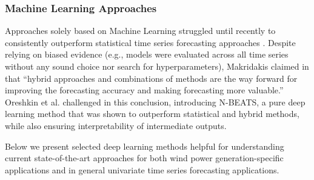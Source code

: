 \subsubsection{Machine Learning Approaches}\label{subsubsec:ml_methods}

Approaches solely based on Machine Learning struggled until recently to consistently outperform statistical time series forecasting approaches \cite{makridakis2018m4}.  Despite relying on biased evidence (e.g., models were evaluated across all time series without any sound choice nor search for hyperparameters), Makridakis claimed in \cite{makridakis2018m4} that ``hybrid approaches and combinations of methods are the way forward for improving the forecasting accuracy and making forecasting more valuable.'' Oreshkin et al. challenged in \cite{oreshkin2019nbeats} this conclusion, introducing N-BEATS, a pure deep learning method that was shown to outperform statistical and hybrid methods, while also ensuring interpretability of intermediate outputs.

Below we present selected deep learning methods helpful for understanding current state-of-the-art approaches for both wind power generation-specific applications and in general univariate time series forecasting applications.

